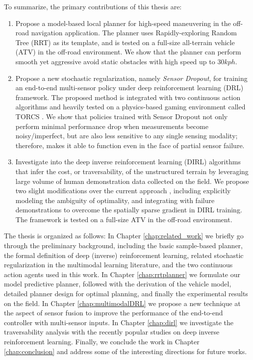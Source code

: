 \documentclass[../thesis.tex]{subfiles}
\begin{document}
To summarize, the primary contributions of this thesis are:
\begin{enumerate}
 
    \item %
    Propose a model-based local planner for high-speed maneuvering in the off-road navigation application. 
    The planner uses Rapidly-exploring Random Tree (RRT) \cite{kuffner2000rrt} as its template, and is tested on a full-size all-terrain vehicle (ATV) in the off-road environment. 
    We show that the planner can perform smooth yet aggressive avoid static obstacles with high speed up to $30 kph$.
 
    \item %
    Propose a new stochastic regularization, namely \emph{Sensor Dropout}, for training an end-to-end multi-sensor policy under deep reinforcement learning (DRL) framework. 
    The proposed method is integrated with two continuous action algorithms and heavily tested on a physics-based gaming environment called TORCS \cite{wymann2000torcs}. 
    We show that policies trained with Sensor Dropout not only perform minimal performance drop when measurements become noisy/imperfect, but are also less sensitive to any single sensing modality; therefore, makes it able to function even in the face of partial sensor failure.
 
    \item %
    Investigate into the deep inverse reinforcement learning (DIRL) algorithms that infer the cost, or traversability, of the unstructured terrain by leveraging large volume of human demonstration data collected on the field. 
    We propose two slight modifications over the current approach \cite{wulfmeier2015maximum}, including explicitly modeling the ambiguity of optimality, and integrating with failure demonstrations to overcome the spatially sparse gradient in DIRL training.
    The framework is tested on a full-size ATV in the off-road environment.
 
\end{enumerate}
 
The thesis is organized as follows:
In Chapter \ref{chap:related_work} we briefly go through the preliminary background, including the basic sample-based planner, the formal definition of deep (inverse) reinforcement learning, related stochastic regularization in the multimodal learning literature, and the two continuous action agents used in this work.
In Chapter \ref{chap:rrtplanner} we formulate our model predictive planner, followed with the derivation of the vehicle model, detailed planner design for optimal planning, and finally the experimental results on the field.
In Chapter \ref{chap:multimodalDRL} we propose a new technique at the aspect of sensor fusion to improve the performance of the end-to-end controller with multi-sensor inputs. 
In Chapter \ref{chap:dirl} we investigate the traversability analysis with the recently popular studies on deep inverse reinforcement learning.
Finally, we conclude the work in Chapter \ref{chap:conclusion} and address some of the interesting directions for future works.
 
\end{document}
